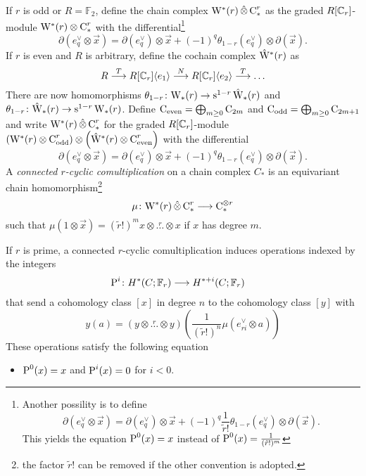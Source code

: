 If $r$ is odd or $R=\mathbb{F}_2$, define the chain complex $\mathrm{W}^*(r)\operatorname{\hat{\otimes}} \operatorname{C}_*^r$ as the graded $R[\mathbb{C}_r]$-module $\mathrm{W}^*(r)\otimes \operatorname{C}_*^r$ with the differential\footnote{Another possility is to define
	\[
	\partial(e^\vee_q\otimes \vec{x}) = \partial (e^\vee_q)\otimes \vec{x} + (-1)^q \frac{1}{\tilde{r}!}\theta_{1-r}(e^\vee_q)\otimes \partial (\vec{x}).
	\]
	This yields the equation $\operatorname{P}^0(x) = x$ instead of $\operatorname{P}^0(x) = \frac{1}{(\tilde{r}!)^m}$
}
\[
\partial(e^\vee_q\otimes \vec{x}) = \partial (e^\vee_q)\otimes \vec{x} + (-1)^q \theta_{1-r}(e^\vee_q)\otimes \partial (\vec{x}).
\]
If $r$ is even and $R$ is arbitrary, define the cochain complex $\hat{\mathrm{W}}^*(r)$ as
\[
R\overset{T}{\longrightarrow} R[\mathbb{C}_r]\langle e_1\rangle \overset{N}{\longrightarrow} R[\mathbb{C}_r]\langle e_2\rangle \overset{T}{\longrightarrow}\ldots
\]
There are now homomorphisms $\theta_{1-r}\colon \mathrm{W}_*(r)\to \operatorname{s}^{1-r}\hat{\mathrm{W}}_*(r)$ and $\theta_{1-r}\colon \hat{\mathrm{W}}_*(r)\to \operatorname{s}^{1-r}\mathrm{W}_*(r)$. Define $\operatorname{C}_{\mathrm{even}} = \bigoplus_{m\geq 0}\operatorname{C}_{2m}$ and $\operatorname{C}_{\mathrm{odd}} = \bigoplus_{m\geq 0}\operatorname{C}_{2m+1}$ and write $\mathrm{W}^*(r)\operatorname{\hat{\otimes}} \operatorname{C}_*^r$ for the graded $R[\mathbb{C}_r]$-module $\left(\mathrm{W}^*(r)\otimes \operatorname{C}_{\mathrm{odd}}^r\right)\otimes \left(\hat{\mathrm{W}}^*(r)\otimes \operatorname{C}_{\mathrm{even}}^r\right)$ with the differential
\[
\partial(e^\vee_q\otimes \vec{x}) = \partial (e^\vee_q)\otimes \vec{x} + (-1)^q \theta_{1-r}(e^\vee_q)\otimes \partial (\vec{x}).
\]
A \emph{connected $r$-cyclic comultiplication} on a chain complex $C_*$ is an equivariant chain homomorphism\footnote{the factor $\tilde{r}!$ can be removed if the other convention is adopted.}
\[
\mu\colon \mathrm{W}^*(r)\operatorname{\hat{\otimes}} \operatorname{C}^r_*\longrightarrow \operatorname{C}_*^{\otimes r}
\]
such that $\mu(1 \otimes \vec{x}) = (\tilde{r}!)^{m}x\otimes\overset{r}{\ldots}\otimes x$ if $x$ has degree $m$.
\begin{proposition}
	If $r$ is prime, a connected $r$-cyclic comultiplication induces operations indexed by the integers
	\begin{align*}
		\operatorname{P}^{i}\colon H^*(C;\mathbb{F}_r)&\longrightarrow H^{*+i}(C;\mathbb{F}_r)
	\end{align*}
	that send a cohomology class $[x]$ in degree $n$ to the cohomology class $[y]$ with
	\[
	y(a) = (y\otimes \overset{r}{\ldots}\otimes y)(\frac{1}{(\tilde{r}!)^n}\mu(e_{ri}^\vee\otimes a))
	\]
	These operations satisfy the following equation
	\begin{itemize}
		\item $\operatorname{P}^0(x) = x$ and $\operatorname{P}^i(x) = 0$ for $i<0$.
	\end{itemize}
\end{proposition}

